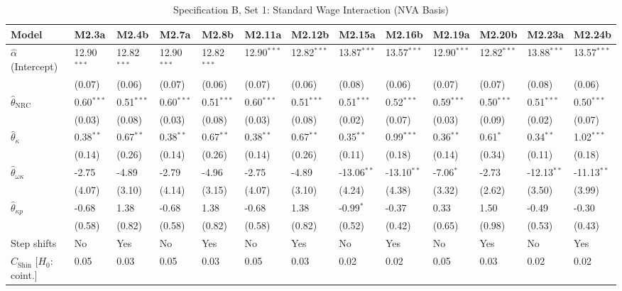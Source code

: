 \FloatBarrier
\begin{table}[h!]
\centering
\caption{Specification B, Set 1: Standard Wage Interaction (NVA Basis)}
\label{tab:specB_set1_nva_app}
\tiny
\setlength{\tabcolsep}{1.5pt}
\begin{tabular}{p{3.2cm}p{1.0cm}p{1.0cm}p{1.0cm}p{1.0cm}p{1.0cm}p{1.0cm}p{1.0cm}p{1.0cm}p{1.0cm}p{1.0cm}p{1.0cm}p{1.0cm}}
\toprule
Model & M2.3a & M2.4b & M2.7a & M2.8b & M2.11a & M2.12b & M2.15a & M2.16b & M2.19a & M2.20b & M2.23a & M2.24b \\
\midrule
$\hat{\alpha}$ (Intercept) & 12.90$^{***}$ & 12.82$^{***}$ & 12.90$^{***}$ & 12.82$^{***}$ & 12.90$^{***}$ & 12.82$^{***}$ & 13.87$^{***}$ & 13.57$^{***}$ & 12.90$^{***}$ & 12.82$^{***}$ & 13.88$^{***}$ & 13.57$^{***}$ \\
 & (0.07) & (0.06) & (0.07) & (0.06) & (0.07) & (0.06) & (0.08) & (0.06) & (0.07) & (0.07) & (0.08) & (0.06) \\
$\hat{\theta}_{\text{NRC}}$ & 0.60$^{***}$ & 0.51$^{***}$ & 0.60$^{***}$ & 0.51$^{***}$ & 0.60$^{***}$ & 0.51$^{***}$ & 0.51$^{***}$ & 0.52$^{***}$ & 0.59$^{***}$ & 0.50$^{***}$ & 0.51$^{***}$ & 0.50$^{***}$ \\
 & (0.03) & (0.08) & (0.03) & (0.08) & (0.03) & (0.08) & (0.02) & (0.07) & (0.03) & (0.09) & (0.02) & (0.07) \\
$\hat{\theta}_{\kappa}$ & 0.38$^{**}$ & 0.67$^{**}$ & 0.38$^{**}$ & 0.67$^{**}$ & 0.38$^{**}$ & 0.67$^{**}$ & 0.35$^{**}$ & 0.99$^{***}$ & 0.36$^{**}$ & 0.61$^{*}$ & 0.34$^{**}$ & 1.02$^{***}$ \\
 & (0.14) & (0.26) & (0.14) & (0.26) & (0.14) & (0.26) & (0.11) & (0.18) & (0.14) & (0.34) & (0.11) & (0.18) \\
$\hat{\theta}_{\omega\kappa}$ & -2.75 & -4.89 & -2.79 & -4.96 & -2.75 & -4.89 & -13.06$^{**}$ & -13.10$^{**}$ & -7.06$^{*}$ & -2.73 & -12.13$^{**}$ & -11.13$^{**}$ \\
 & (4.07) & (3.10) & (4.14) & (3.15) & (4.07) & (3.10) & (4.24) & (4.38) & (3.32) & (2.62) & (3.50) & (3.99) \\
$\hat{\theta}_{\kappa p}$ & -0.68 & 1.38 & -0.68 & 1.38 & -0.68 & 1.38 & -0.99$^{*}$ & -0.37 & 0.33 & 1.50 & -0.49 & -0.30 \\
 & (0.58) & (0.82) & (0.58) & (0.82) & (0.58) & (0.82) & (0.52) & (0.42) & (0.65) & (0.98) & (0.53) & (0.43) \\
\midrule
Step shifts & No & Yes & No & Yes & No & Yes & No & Yes & No & Yes & No & Yes \\
$C_{\text{Shin}}$ [$H_0$: coint.] & 0.05 & 0.03 & 0.05 & 0.03 & 0.05 & 0.03 & 0.02 & 0.02 & 0.05 & 0.03 & 0.02 & 0.02 \\

\end{tabular}
\end{table}
